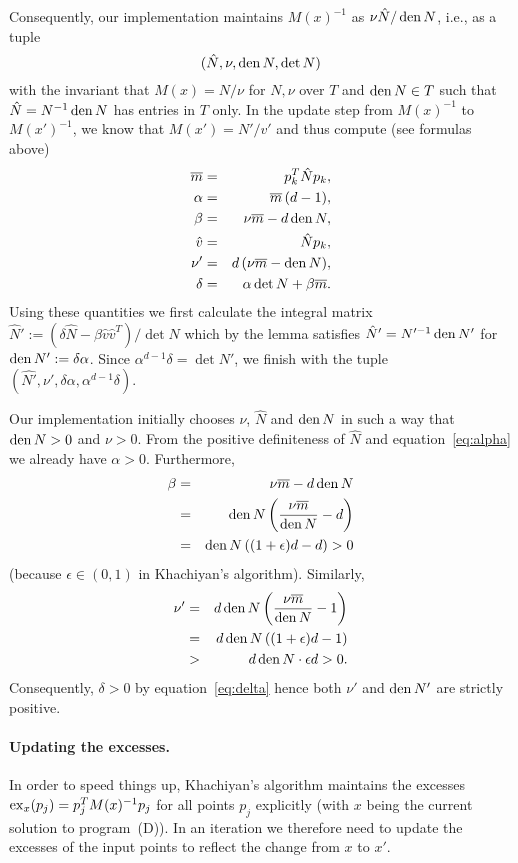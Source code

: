 \documentclass[a4paper,twocolumn]{article}
\newcommand{\D}{\ensuremath{T}}%
\newcommand{\den}{\ensuremath{\mathop{\rm den}\nolimits}}
\newcommand{\excess}{\ensuremath{\mathop{\rm ex}\nolimits}}
\newcommand{\ov}[1]{\overline{#1}}
\begin{document}
Consequently, our implementation maintains $M(x)^{-1}$ as
$\nu\hat{N}/\den{N}$, i.e., as a tuple
\[
(\hat{N},\nu,\den{N},\det{N})
\]
with the invariant that $M(x)=N/\nu$ for $N,\nu$ over $\D$ and
$\den{N}\in T$ such that $\hat{N} = N^{-1}\den{N}$ has entries in $T$
only.  In the update step from $M(x)^{-1}$ to $M(x')^{-1}$, we know
that $M(x')=N'/v'$ and thus compute (see formulas above)
\begin{eqnarray}
  \ov{m}  &=& p_k^T \hat{N} p_k, \nonumber\\
  \alpha  &=& \ov{m}\,(d-1), \label{eq:alpha}\\
  \beta   &=& \nu\ov{m}-d\den{N}, \nonumber\\
  \hat{v} &=& \hat{N}p_k, \nonumber\\
  \nu'    &=& d\,(\nu\ov{m}-\den{N}), \nonumber\\
  \delta  &=& \alpha\det{N} + \beta\ov{m}\label{eq:delta}.
\end{eqnarray}
Using these quantities we first calculate the integral matrix $\hat{N}':=
(\delta \hat{N}-\beta \hat{v}\hat{v}^T)/\det{N}$ which by the lemma
satisfies $\hat{N}' = N'^{-1}\den{N'}$ for $\den{N'}:= \delta\alpha$.
Since $\alpha^{d-1}\delta = \det{N'}$, we finish with the tuple
$(\hat{N'},\nu',\delta\alpha,\alpha^{d-1}\delta)$.

Our implementation initially chooses $\nu$, $\hat{N}$ and $\den{N}$ in
such a way that $\den{N}>0$ and $\nu>0$.  From the positive
definiteness of $\hat{N}$ and equation~\eqref{eq:alpha} we already
have $\alpha>0$.  Furthermore,
\begin{eqnarray*}
  \beta &=& \nu\ov{m} - d\den{N} \\
        &=& \den{N}\left(\frac{\nu\ov{m}}{\den{N}} - d\right) \\
        &=& \den{N} \left( (1+\epsilon) d - d \right) > 0
\end{eqnarray*}
(because $\epsilon\in(0,1)$ in Khachiyan's algorithm). Similarly,
\begin{eqnarray*}
  \nu' &=& d\den{N}\left(\frac{\nu\ov{m}}{\den{N}} - 1\right) \\
       &=& d\den{N}\left((1+\epsilon) d - 1\right) \\
       &>& d\den{N} \cdot \epsilon d > 0.
\end{eqnarray*}
Consequently, $\delta>0$ by equation~\eqref{eq:delta} hence both
$\nu'$ and $\den{N'}$ are strictly positive.

\paragraph{Updating the excesses.}
In order to speed things up, Khachiyan's algorithm maintains the
excesses $\excess_x(p_j) = p_j^T M(x)^{-1} p_j$ for all points $p_j$
explicitly (with $x$ being the current solution to program~(D)).  In
an iteration we therefore need to update the excesses of the input
points to reflect the change from $x$ to $x'$.
\end{document}
